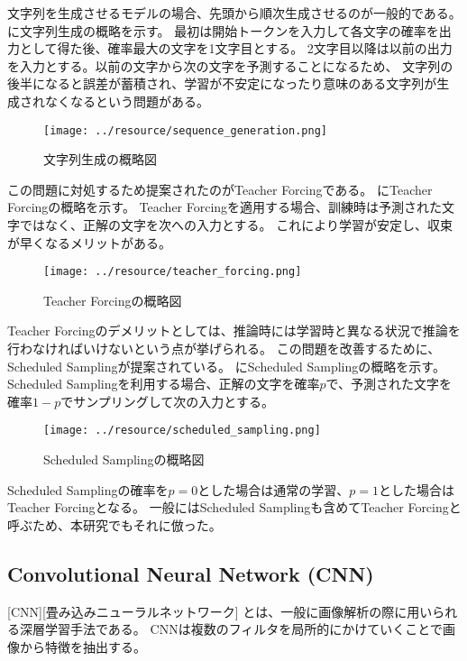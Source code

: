 文字列を生成させるモデルの場合、先頭から順次生成させるのが一般的である。
に文字列生成の概略を示す。
最初は開始トークンを入力して各文字の確率を出力として得た後、確率最大の文字を1文字目とする。
2文字目以降は以前の出力を入力とする。以前の文字から次の文字を予測することになるため、
文字列の後半になると誤差が蓄積され、学習が不安定になったり意味のある文字列が生成されなくなるという問題がある。
\begin{figure}[tbp]
    \centering
    \texttt{[image: ../resource/sequence\_generation.png]}
    \caption{文字列生成の概略図} \label{fig:sequence_generation}
\end{figure}


この問題に対処するため提案されたのがTeacher Forcing\cite{teacher-forcing}である。
にTeacher Forcingの概略を示す。
Teacher Forcingを適用する場合、訓練時は予測された文字ではなく、正解の文字を次への入力とする。
これにより学習が安定し、収束が早くなるメリットがある。
\begin{figure}[tbp]
    \centering
    \texttt{[image: ../resource/teacher\_forcing.png]}
    \caption{Teacher Forcingの概略図} \label{fig:teacher_forcing}
\end{figure}


Teacher Forcingのデメリットとしては、推論時には学習時と異なる状況で推論を行わなければいけないという点が挙げられる。
この問題を改善するために、Scheduled Sampling\cite{scheduled-sampling}が提案されている。
にScheduled Samplingの概略を示す。
Scheduled Samplingを利用する場合、正解の文字を確率$p$で、予測された文字を確率$1-p$でサンプリングして次の入力とする。
\begin{figure}[tbp]
    \centering
    \texttt{[image: ../resource/scheduled\_sampling.png]}
    \caption{Scheduled Samplingの概略図} \label{fig:scheduled_sampling}
\end{figure}


Scheduled Samplingの確率を$p=0$とした場合は通常の学習、$p=1$とした場合はTeacher Forcingとなる。
一般にはScheduled Samplingも含めてTeacher Forcingと呼ぶため、本研究でもそれに倣った。

\subsection{Convolutional Neural Network (CNN)} \label{cnn}

[CNN][畳み込みニューラルネットワーク] とは、一般に画像解析の際に用いられる深層学習手法である。
CNNは複数のフィルタを局所的にかけていくことで画像から特徴を抽出する。

